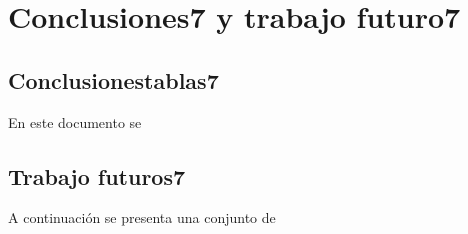 \chapter{Conclusiones7 y trabajo futuro7}


\section{Conclusionestablas7}

En este documento se

\section{Trabajo futuros7}

A continuación se presenta una conjunto de 


